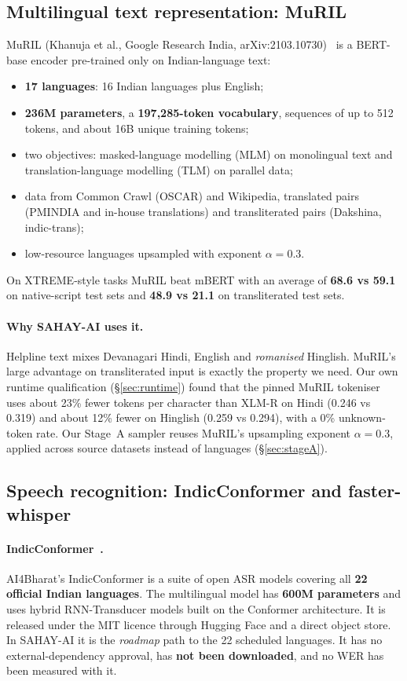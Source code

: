 \documentclass[11pt,a4paper]{article}
\begin{document}
\subsection{Multilingual text representation: MuRIL}
MuRIL (Khanuja et al., Google Research India, arXiv:2103.10730)~\cite{khanuja2021} is a BERT-base encoder pre-trained
only on Indian-language text:
\begin{itemize}
  \item \textbf{17 languages}: 16 Indian languages plus English;
  \item \textbf{236M parameters}, a \textbf{197{,}285-token vocabulary}, sequences of up to 512
        tokens, and about 16B unique training tokens;
  \item two objectives: masked-language modelling (MLM) on monolingual text and translation-language
        modelling (TLM) on parallel data;
  \item data from Common Crawl (OSCAR) and Wikipedia, translated pairs (PMINDIA and in-house
        translations) and transliterated pairs (Dakshina, indic-trans);
  \item low-resource languages upsampled with exponent $\alpha = 0.3$.
\end{itemize}
On XTREME-style tasks MuRIL beat mBERT with an average of \textbf{68.6 vs 59.1} on native-script test
sets and \textbf{48.9 vs 21.1} on transliterated test sets.

\paragraph{Why SAHAY-AI uses it.} Helpline text mixes Devanagari Hindi, English and \emph{romanised}
Hinglish. MuRIL's large advantage on transliterated input is exactly the property we need. Our own
runtime qualification (\S\ref{sec:runtime}) found that the pinned MuRIL tokeniser uses about 23\%
fewer tokens per character than XLM-R on Hindi (0.246 vs 0.319) and about 12\% fewer on Hinglish
(0.259 vs 0.294), with a 0\% unknown-token rate. Our Stage~A sampler reuses MuRIL's upsampling
exponent $\alpha=0.3$, applied across source datasets instead of languages (\S\ref{sec:stageA}).

\subsection{Speech recognition: IndicConformer and faster-whisper}
\paragraph{IndicConformer~\cite{ai4bharat}.} AI4Bharat's IndicConformer is a suite of open ASR models
covering all \textbf{22 official Indian languages}. The multilingual model has \textbf{600M
parameters} and uses hybrid RNN-Transducer models built on the Conformer architecture. It is
released under the MIT licence through Hugging Face and a direct object store. In SAHAY-AI it is the
\emph{roadmap} path to the 22 scheduled languages. It has no external-dependency approval, has
\textbf{not been downloaded}, and no WER has been measured with it.
\end{document}
